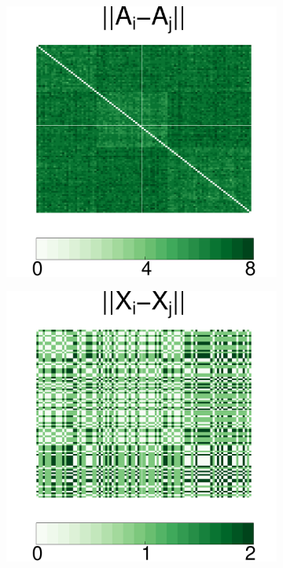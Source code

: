 \documentclass[12pt]{article}
\begin{document}
\begin{figure}[H]
\begin{subfigure}[b]{0.23\textwidth}
		\caption{}
		\label{fig:b}
	\end{subfigure}
	~ %
	\begin{subfigure}[b]{0.23\textwidth}
		\includegraphics[width=\textwidth]{../../Figure/distA.pdf}
		\caption{}
		\label{fig:c}
	\end{subfigure}
	\begin{subfigure}[b]{0.23\textwidth}
		\includegraphics[width=\textwidth]{../../Figure/distX.pdf}

\end{subfigure}
\end{figure}
\end{document}
